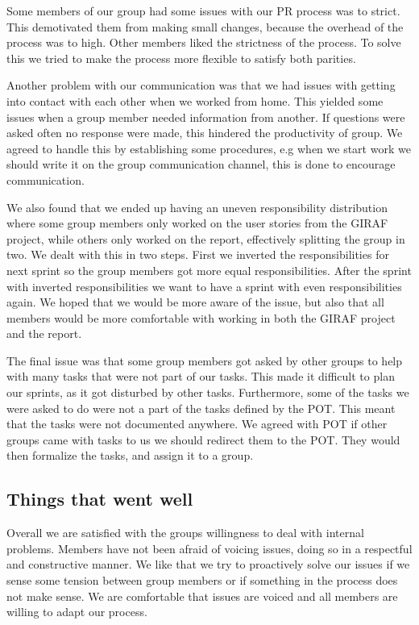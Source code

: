 Some members of our group had some issues with our \gls{PR} process was to strict. This demotivated them from making small changes, because the overhead of the process was to high. Other members liked the strictness of the process. To solve this we tried to make the process more flexible to satisfy both parities.

Another problem with our communication was that we had issues with getting into contact with each other when we worked from home. This yielded some issues when a group member needed information from another. If questions were asked often no response were made, this hindered the productivity of group. We agreed to handle this by establishing some procedures, e.g when we start work we should write it on the group communication channel, this is done to encourage communication.

We also found that we ended up having an uneven responsibility distribution where some group members only worked on the user stories from the GIRAF project, while others only worked on the report, effectively splitting the group in two. We dealt with this in two steps. First we inverted the responsibilities for next sprint so the group members got more equal responsibilities. After the sprint with inverted responsibilities we want to have a sprint with even responsibilities again. We hoped that we would be more aware of the issue, but also that all members would be more comfortable with working in both the GIRAF project and the report.

The final issue was that some group members got asked by other groups to help with many tasks that were not part of our tasks. This made it difficult to plan our sprints, as it got disturbed by other tasks. Furthermore, some of the tasks we were asked to do were not a part of the tasks defined by the \gls{POT}. This meant that the tasks were not documented anywhere.
We agreed with \gls{POT} if other groups came with tasks to us we should redirect them to the \gls{POT}. They would then formalize the tasks, and assign it to a group.

\subsection{Things that went well}

Overall we are satisfied with the groups willingness to deal with internal problems. Members have not been afraid of voicing issues, doing so in a respectful and constructive manner. We like that we try to proactively solve our issues if we sense some tension between group members or if something in the process does not make sense. We are comfortable that issues are voiced and all members are willing to adapt our process. 